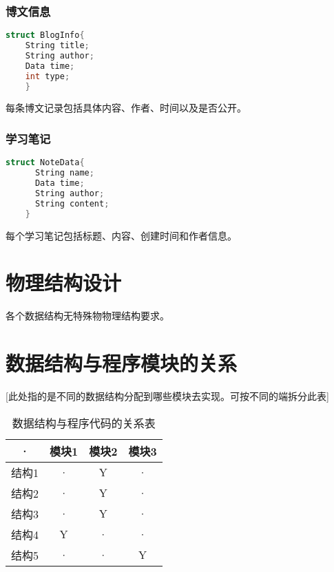   \subsubsection{博文信息}
  \begin{lstlisting}[language=C,caption=博文信息]
    struct BlogInfo{
    String title;
    String author;
    Data time;
    int type;
    }
  \end{lstlisting}
  每条博文记录包括具体内容、作者、时间以及是否公开。
  \subsubsection{学习笔记}
  \begin{lstlisting}[language=C,caption=学习笔记]
    struct NoteData{
      String name;
      Data time;
      String author;
      String content;
    }
  \end{lstlisting}
  每个学习笔记包括标题、内容、创建时间和作者信息。

\section{物理结构设计}
各个数据结构无特殊物物理结构要求。

\section{数据结构与程序模块的关系}
[此处指的是不同的数据结构分配到哪些模块去实现。可按不同的端拆分此表]
\begin{table}[htbp]
\centering
\caption{数据结构与程序代码的关系表} \label{tab:datastructure-module}
\begin{tabular}{|c|c|c|c|}
    \hline
    · & 模块1 & 模块2 & 模块3 \\
    \hline
    结构1 & · & Y & · \\
    \hline
    结构2 & · & Y & · \\
    \hline
    结构3 & · & Y & · \\
    \hline
    结构4 & Y & · & · \\
    \hline
    结构5 & · & · & Y \\
    \hline
\end{tabular}
\end{table}
